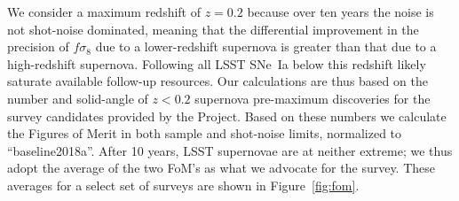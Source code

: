 \documentclass[a4paper,10pt]{article}
\begin{document}
We consider a maximum redshift of $z=0.2$ because over ten years the noise is not shot-noise dominated, meaning that the differential improvement
in the precision of
$f\sigma_8$ due to a lower-redshift supernova is greater than that due to a high-redshift supernova.  Following all LSST SNe~Ia below this redshift 
likely saturate available follow-up resources.
Our calculations are thus based on the number and solid-angle of $z<0.2$ supernova pre-maximum discoveries 
for the survey candidates provided by the Project.  Based on these numbers we calculate the Figures of Merit in
both sample and shot-noise limits, normalized to ``baseline2018a''.
After 10 years,
LSST supernovae are at neither extreme; we thus adopt the average of the two FoM's as what we advocate for the survey.
These averages for a select set of surveys are shown in Figure~\ref{fig:fom}.
%
\end{document}
